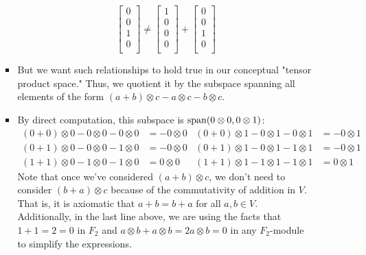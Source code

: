 \documentclass[../notes.tex]{subfiles}
\begin{document}
\begin{itemize}
\begin{itemize}
\begin{itemize}
            \begin{equation*}
                \begin{bmatrix}
                    0\\
                    0\\
                    1\\
                    0\\
                \end{bmatrix}
                \neq
                \begin{bmatrix}
                    1\\
                    0\\
                    0\\
                    0\\
                \end{bmatrix}
                +
                \begin{bmatrix}
                    0\\
                    0\\
                    1\\
                    0\\
                \end{bmatrix}
            \end{equation*}
            \item But we want such relationships to hold true in our conceptual "tensor product space." Thus, we quotient it by the subspace spanning all elements of the form $(a+b)\otimes c-a\otimes c-b\otimes c$.
            \item By direct computation, this subspace is $\operatorname{span}(0\otimes 0,0\otimes 1)$:
            \begin{align*}
                (0+0)\otimes 0-0\otimes 0-0\otimes 0 &= -0\otimes 0&
                    (0+0)\otimes 1-0\otimes 1-0\otimes 1 &= -0\otimes 1\\
                (0+1)\otimes 0-0\otimes 0-1\otimes 0 &= -0\otimes 0&
                    (0+1)\otimes 1-0\otimes 1-1\otimes 1 &= -0\otimes 1\\
                (1+1)\otimes 0-1\otimes 0-1\otimes 0 &= 0\otimes 0&
                    (1+1)\otimes 1-1\otimes 1-1\otimes 1 &= 0\otimes 1
            \end{align*}
            Note that once we've considered $(a+b)\otimes c$, we don't need to consider $(b+a)\otimes c$ because of the commutativity of addition in $V$. That is, it is axiomatic that $a+b=b+a$ for all $a,b\in V$. Additionally, in the last line above, we are using the facts that $1+1=2=0$ in $F_2$ and $a\otimes b+a\otimes b=2a\otimes b=0$ in any $F_2$-module to simplify the expressions.

\end{itemize}
\end{itemize}
\end{itemize}
\end{document}
